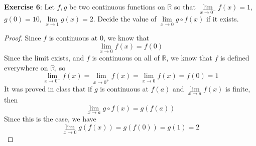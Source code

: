 \documentclass{article}
\begin{document}
\textbf{Exercise 6}: Let $f, g$ be two continuous functions on $\mathbb{R}$ so that $\lim\limits_{x \to 0^{-}}f(x) = 1$, $g(0) = 10$, $\lim\limits_{x \to 1}g(x) = 2$. Decide the value of $\lim\limits_{x \to 0}g \circ f(x)$ if it exists.
    \begin{proof}
        Since $f$ is continuous at $0$, we know that
            \begin{equation*}
                \lim\limits_{x \to 0}f(x) = f(0)
            \end{equation*}
        Since the limit exists, and $f$ is continuous on all of $\mathbb{R}$, we know that $f$ is defined everywhere on $\mathbb{R}$, so
            \begin{equation*}
                \lim\limits_{x \to 0^{-}}f(x) = \lim\limits_{x \to 0^{+}}f(x) = \lim\limits_{x \to 0}f(x) = f(0) = 1
            \end{equation*}
        It was proved in class that if $g$ is continuous at $f(a)$ and $\lim\limits_{x \to a}f(x)$ is finite, then
            \begin{equation*}
                \lim\limits_{x \to a}g \circ f(x) = g(f(a))
            \end{equation*}
        Since this is the case, we have
            \begin{equation*}
                \lim\limits_{x \to 0}g(f(x)) = g(f(0)) = g(1) = 2
            \end{equation*}
    \end{proof}
\end{document}
